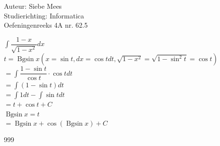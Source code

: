 \documentclass[a4paper]{article}
\newcommand{\Bgsin}{\operatorname{Bgsin}}
\begin{document}
  
\noindent \large Auteur: Siebe Mees \\
\noindent \large Studierichting: Informatica\\
\noindent \large Oefeningenreeks 4A nr. 62.5\\

\medskip

\normalsize

$ \displaystyle\int \dfrac{1 - x}{\sqrt{1 - x^2}} dx $\\

$ t = \Bgsin x \left(x = \sin t, dx = \cos t dt, \sqrt{1 - x^2} = \sqrt{1 - \sin^2 t} = \cos t \right) $\\

$ = \displaystyle\int \dfrac{1 - \sin t}{\cos t} \cdot \cos t dt $\\

$ = \displaystyle\int (1 - \sin t) dt $\\

$ = \displaystyle\int 1 dt - \displaystyle\int \sin t dt $\\

$ = t + \cos t + C $\\

$ \Bgsin x = t $\\

$ = \Bgsin x + \cos (\Bgsin x) + C $\\

\begin{thebibliography}{999}
\end{thebibliography}
\end{document}
